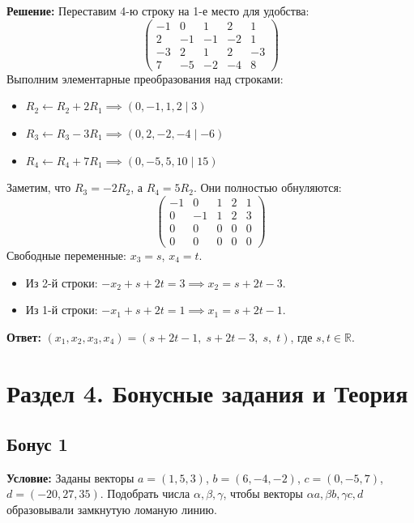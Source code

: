 \documentclass[11pt, a4paper]{article}
\begin{document}
\textbf{Решение:}
Переставим 4-ю строку на 1-е место для удобства:
$$ \left(\begin{array}{cccc|c} -1 & 0 & 1 & 2 & 1 \\ 2 & -1 & -1 & -2 & 1 \\ -3 & 2 & 1 & 2 & -3 \\ 7 & -5 & -2 & -4 & 8 \end{array}\right) $$
Выполним элементарные преобразования над строками:
\begin{itemize}
\item $R_2 \leftarrow R_2 + 2R_1 \implies (0, -1, 1, 2 \mid 3)$
\item $R_3 \leftarrow R_3 - 3R_1 \implies (0, 2, -2, -4 \mid -6)$
\item $R_4 \leftarrow R_4 + 7R_1 \implies (0, -5, 5, 10 \mid 15)$
\end{itemize}
Заметим, что $R_3 = -2R_2$, а $R_4 = 5R_2$. Они полностью обнуляются:
$$ \left(\begin{array}{cccc|c} -1 & 0 & 1 & 2 & 1 \\ 0 & -1 & 1 & 2 & 3 \\ 0 & 0 & 0 & 0 & 0 \\ 0 & 0 & 0 & 0 & 0 \end{array}\right) $$
Свободные переменные: $x_3 = s$, $x_4 = t$.
\begin{itemize}
\item Из 2-й строки: $-x_2 + s + 2t = 3 \implies x_2 = s + 2t - 3$.
\item Из 1-й строки: $-x_1 + s + 2t = 1 \implies x_1 = s + 2t - 1$.
\end{itemize}

\textbf{Ответ:} $(x_1, x_2, x_3, x_4) = (s + 2t - 1, \; s + 2t - 3, \; s, \; t)$, где $s, t \in \mathbb{R}$.

\newpage

\section{Раздел 4. Бонусные задания и Теория}

\subsection*{Бонус 1}
\textbf{Условие:} Заданы векторы $a=(1,5,3)$, $b=(6,-4,-2)$, $c=(0,-5,7)$, $d=(-20,27,35)$. Подобрать числа $\alpha, \beta, \gamma$, чтобы векторы $\alpha a, \beta b, \gamma c, d$ образовывали замкнутую ломаную линию.
\end{document}
